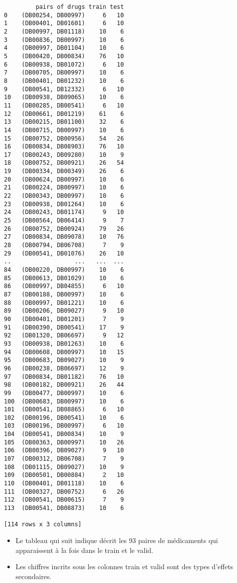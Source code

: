 \documentclass[11pt]{article}
\begin{document}
    
    \begin{verbatim}
         pairs of drugs train test
0    (DB00254, DB00997)     6   10
1    (DB00401, DB01601)     6   10
2    (DB00997, DB01118)    10    6
3    (DB00836, DB00997)    10    6
4    (DB00997, DB01104)    10    6
5    (DB00420, DB00834)    76   10
6    (DB00938, DB01072)     6   10
7    (DB00705, DB00997)    10    6
8    (DB00401, DB01232)    10    6
9    (DB00541, DB12332)     6   10
10   (DB00938, DB09065)    10    6
11   (DB00285, DB00541)     6   10
12   (DB00661, DB01219)    61    6
13   (DB00215, DB01100)    32    6
14   (DB00715, DB00997)    10    6
15   (DB00752, DB00956)    54   26
16   (DB00834, DB08903)    76   10
17   (DB00243, DB09280)    10    9
18   (DB00752, DB00921)    26   54
19   (DB00334, DB00349)    26    6
20   (DB00624, DB00997)    10    6
21   (DB00224, DB00997)    10    6
22   (DB00343, DB00997)    10    6
23   (DB00938, DB01264)    10    6
24   (DB00243, DB01174)     9   10
25   (DB00564, DB06414)     9    7
26   (DB00752, DB00924)    79   26
27   (DB00834, DB09078)    10   76
28   (DB00794, DB06708)     7    9
29   (DB00541, DB01076)    26   10
..                  ...   ...  ...
84   (DB00220, DB00997)    10    6
85   (DB00613, DB01029)    10    6
86   (DB00997, DB04855)     6   10
87   (DB00188, DB00997)    10    6
88   (DB00997, DB01221)    10    6
89   (DB00206, DB09027)     9   10
90   (DB00401, DB01201)     7    9
91   (DB00390, DB00541)    17    9
92   (DB01320, DB06697)     9   12
93   (DB00938, DB01263)    10    6
94   (DB00608, DB00997)    10   15
95   (DB00683, DB09027)    10    9
96   (DB00238, DB06697)    12    9
97   (DB00834, DB01182)    76   10
98   (DB00182, DB00921)    26   44
99   (DB00477, DB00997)    10    6
100  (DB00683, DB00997)    10    6
101  (DB00541, DB08865)     6   10
102  (DB00196, DB00541)    10    6
103  (DB00196, DB00997)     6   10
104  (DB00541, DB00834)    10    9
105  (DB00363, DB00997)    10   26
106  (DB00396, DB09027)     9   10
107  (DB00312, DB06708)     7    9
108  (DB01115, DB09027)    10    9
109  (DB00501, DB00884)     2   10
110  (DB00401, DB01118)    10    6
111  (DB00327, DB00752)     6   26
112  (DB00541, DB00615)     7    9
113  (DB00541, DB08873)    10    6

[114 rows x 3 columns]
    \end{verbatim}

    
    \begin{itemize}
\item
  Le tableau qui suit indique décrit les 93 paires de médicaments qui
  apparaissent à la fois dans le train et le valid.
\item
  Les chiffres incrits sous les colonnes train et valid sont des types
  d'effets secondaires.
\end{itemize}
\end{document}
